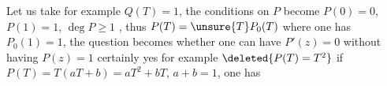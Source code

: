 Let us take for example $Q(T)=1$, the conditions on $P$ become $P(0)=0$, $P(1)=1$, $\deg P\geq1$ , thus $P(T)=\unsure{T}P_0(T)$ where one has $P_0(1)=1$, the question becomes whether one can have  $P'(z)=0$ without having $P(z)=1$ certainly yes for example $\deleted{P(T)=T^2}$ if $P(T)=T(aT+b)=aT^2+bT$, $a+b=1$, one has
